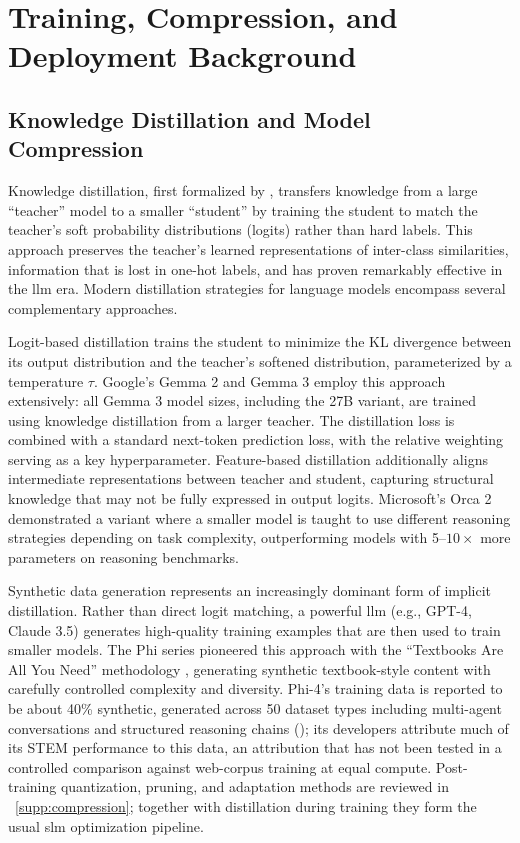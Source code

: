 
\section{Training, Compression, and Deployment Background}
\label{supp:background}

\subsection{Knowledge Distillation and Model Compression}
\label{subsec:background_distillation}
Knowledge distillation, first formalized by \citet{hinton2015distilling}, transfers knowledge from a large ``teacher'' model to a smaller ``student'' by training the student to match the teacher's soft probability distributions (logits) rather than hard labels. This approach preserves the teacher's learned representations of inter-class similarities, information that is lost in one-hot labels, and has proven remarkably effective in the \gls{llm} era. Modern distillation strategies for language models encompass several complementary approaches.

Logit-based distillation trains the student to minimize the KL divergence between its output distribution and the teacher's softened distribution, parameterized by a temperature $\tau$. Google's Gemma 2 \citep{gemma2team2024} and Gemma 3 \citep{team2025gemma3} employ this approach extensively: all Gemma 3 model sizes, including the 27B variant, are trained using knowledge distillation from a larger teacher. The distillation loss is combined with a standard next-token prediction loss, with the relative weighting serving as a key hyperparameter. Feature-based distillation \citep{romero2015fitnets} additionally aligns intermediate representations between teacher and student, capturing structural knowledge that may not be fully expressed in output logits. Microsoft's Orca 2 \citep{mitra2023orca2} demonstrated a variant where a smaller model is taught to use different reasoning strategies depending on task complexity, outperforming models with 5--$10\times$ more parameters on reasoning benchmarks.

Synthetic data generation represents an increasingly dominant form of implicit distillation. Rather than direct logit matching, a powerful \gls{llm} (e.g., GPT-4, Claude 3.5) generates high-quality training examples that are then used to train smaller models. The Phi series pioneered this approach with the ``Textbooks Are All You Need'' methodology \citep{gunasekar2023phi1}, generating synthetic textbook-style content with carefully controlled complexity and diversity. Phi-4's training data is reported to be about 40\% synthetic, generated across 50 dataset types including multi-agent conversations and structured reasoning chains \citep{abdin2024phi4} (\evC); its developers attribute much of its STEM performance to this data, an attribution that has not been tested in a controlled comparison against web-corpus training at equal compute. Post-training quantization, pruning, and adaptation methods are reviewed in \suppsec~\ref{supp:compression}; together with distillation during training they form the usual \gls{slm} optimization pipeline.


